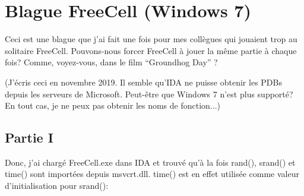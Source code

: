﻿\section{Blague FreeCell (Windows 7)}

\renewcommand{\CURPATH}{examples/freecell}

Ceci est une blague que j'ai fait une fois pour mes collègues qui jouaient trop
au solitaire FreeCell.
Pouvons-nous forcer FreeCell à jouer la même partie à chaque fois?
Comme, voyez-vous, dans le film ``Groundhog Day'' ?

(J'écris ceci en novembre 2019. Il semble qu'IDA ne puisse obtenir les PDBs depuis les serveurs
de Microsoft. Peut-être que Windows 7 n'est plus supporté? En tout cas, je ne peux
pas obtenir les noms de fonction...)

\subsection{Partie I}

Donc, j'ai chargé FreeCell.exe dans IDA et trouvé qu'à la fois rand(), srand() et
time() sont importées depuis msvcrt.dll.
time() est en effet utilisée comme valeur d'initialisation pour srand():


